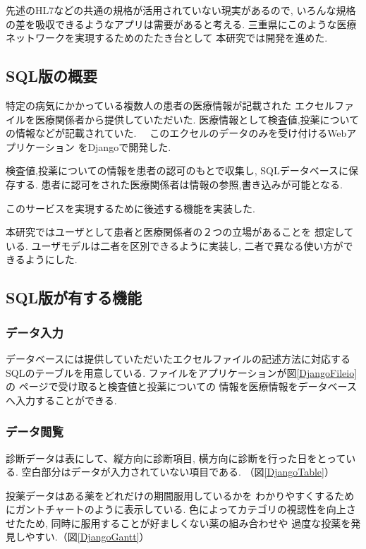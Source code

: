 先述のHL7などの共通の規格が活用されていない現実があるので,
いろんな規格の差を吸収できるようなアプリは需要があると考える.
三重県にこのような医療ネットワークを実現するためのたたき台として
本研究では開発を進めた.
\fi



\subsection{SQL版の概要}
  特定の病気にかかっている複数人の患者の医療情報が記載された
  エクセルファイルを医療関係者から提供していただいた.
  医療情報として検査値,投薬についての情報などが記載されていた.
　このエクセルのデータのみを受け付けるWebアプリケーション
  をDjangoで開発した.

  検査値,投薬についての情報を患者の認可のもとで収集し,
  SQLデータベースに保存する.
  患者に認可をされた医療関係者は情報の参照,書き込みが可能となる.

  このサービスを実現するために後述する機能を実装した.

  本研究ではユーザとして患者と医療関係者の２つの立場があることを
  想定している.
  ユーザモデルは二者を区別できるように実装し,
  二者で異なる使い方ができるようにした.



\subsection{SQL版が有する機能}
  \subsubsection{データ入力}
    データベースには提供していただいたエクセルファイルの記述方法に対応する
    SQLのテーブルを用意している.
    ファイルをアプリケーションが図\ref{DjangoFileio}の
    ページで受け取ると検査値と投薬についての
    情報を医療情報をデータベースへ入力することができる.

  \subsubsection{データ閲覧}
    診断データは表にして、縦方向に診断項目,
    横方向に診断を行った日をとっている.
    空白部分はデータが入力されていない項目である.
    （図\ref{DjangoTable}）


    投薬データはある薬をどれだけの期間服用しているかを
    わかりやすくするためにガントチャートのように表示している.
    色によってカテゴリの視認性を向上させたため,
    同時に服用することが好ましくない薬の組み合わせや
    過度な投薬を発見しやすい.（図\ref{DjangoGantt}）

